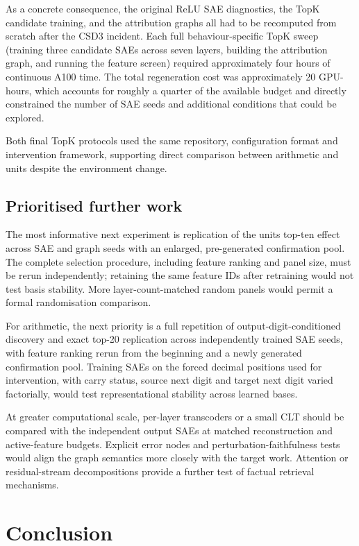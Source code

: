 \documentclass[11pt,a4paper]{article}
\begin{document}
As a concrete consequence, the original ReLU SAE diagnostics, the TopK candidate training, and the attribution graphs all had to be recomputed from scratch after the CSD3 incident. Each full behaviour-specific TopK sweep (training three candidate SAEs across seven layers, building the attribution graph, and running the feature screen) required approximately four hours of continuous A100 time. The total regeneration cost was approximately 20 GPU-hours, which accounts for roughly a quarter of the available budget and directly constrained the number of SAE seeds and additional conditions that could be explored.

Both final TopK protocols used the same repository, configuration format and intervention framework, supporting direct comparison between arithmetic and units despite the environment change.

\subsection{Prioritised further work}

The most informative next experiment is replication of the units top-ten effect across SAE and graph seeds with an enlarged, pre-generated confirmation pool. The complete selection procedure, including feature ranking and panel size, must be rerun independently; retaining the same feature IDs after retraining would not test basis stability. More layer-count-matched random panels would permit a formal randomisation comparison.

For arithmetic, the next priority is a full repetition of output-digit-conditioned discovery and exact top-20 replication across independently trained SAE seeds, with feature ranking rerun from the beginning and a newly generated confirmation pool. Training SAEs on the forced decimal positions used for intervention, with carry status, source next digit and target next digit varied factorially, would test representational stability across learned bases.

At greater computational scale, per-layer transcoders or a small CLT should be compared with the independent output SAEs at matched reconstruction and active-feature budgets. Explicit error nodes and perturbation-faithfulness tests would align the graph semantics more closely with the target work. Attention or residual-stream decompositions provide a further test of factual retrieval mechanisms.

\section{Conclusion}
\end{document}
